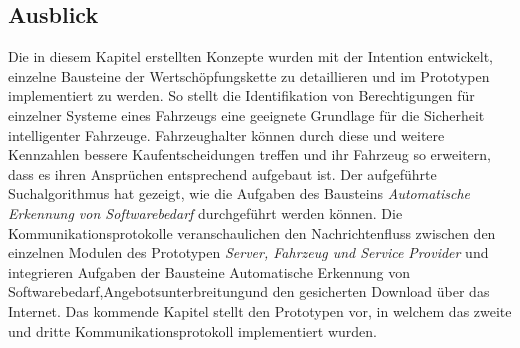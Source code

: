 \subsection{Ausblick}
Die in diesem Kapitel erstellten Konzepte wurden mit der Intention entwickelt, einzelne Bausteine der Wertschöpfungskette zu detaillieren und im Prototypen implementiert zu werden. So stellt die Identifikation von Berechtigungen für einzelner Systeme eines Fahrzeugs eine geeignete Grundlage für die Sicherheit intelligenter Fahrzeuge. Fahrzeughalter können durch diese und weitere Kennzahlen bessere Kaufentscheidungen treffen und ihr Fahrzeug so erweitern, dass es ihren Ansprüchen entsprechend aufgebaut ist. Der aufgeführte Suchalgorithmus hat gezeigt, wie die Aufgaben des Bausteins \textit{\glqq Automatische Erkennung von Softwarebedarf\grqq} durchgeführt werden können. Die Kommunikationsprotokolle veranschaulichen den Nachrichtenfluss zwischen den einzelnen Modulen des Prototypen \textit{Server, Fahrzeug und Service Provider} und integrieren Aufgaben der Bausteine \glqq Automatische Erkennung von Softwarebedarf\grqq,\glqq Angebotsunterbreitung\grqq und \glqq den gesicherten Download über das Internet\grqq. Das kommende Kapitel stellt den Prototypen vor, in welchem das zweite und dritte Kommunikationsprotokoll implementiert wurden.
\clearpage